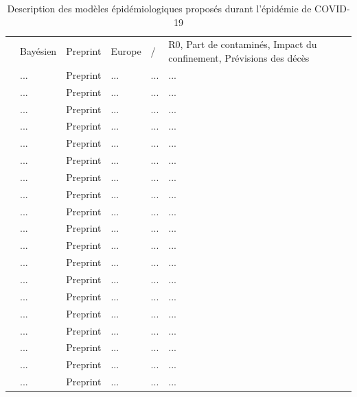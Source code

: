 \documentclass[review]{elsarticle}
\begin{document}
\begin{table}
\begin{adjustbox}{center}
{\begin{tabular}{p{4cm}|p{2cm}|p{2cm}|p{2cm}|p{2cm}|p{11cm}}
  \citet{flaxman_report_2020} & Bayésien & Preprint & Europe & / & R0, Part de contaminés, Impact du confinement, Prévisions des décès \\
  \citet{ferguson_report_2020} & ... & Preprint & ... &... &...  \\
  \citet{di_domenico_expected_2020} & ... & Preprint & ... &... &...  \\
  \citet{wilder_role_2020} & ... & Preprint & ... &... &...  \\
  \citet{simha_simple_2020} & ... & Preprint & ... &... &...  \\
  \citet{roux_covid-19_2020} & ... & Preprint & ... &... &...  \\
  \citet{pullano_population_2020} & ... & Preprint & ... &... &...  \\
  \citet{salje_estimating_2020} & ... & Preprint & ... &... &...  \\
  \citet{team_forecasting_2020} & ... & Preprint & ... &... &...  \\
  \citet{luo_predictive_2020} & ... & Preprint & ... &... &...  \\
  \citet{branas_flattening_2020} & ... & Preprint & ... &... &...  \\
  \citet{keskinocak_impact_2020} & ... & Preprint & ... &... &...  \\
  \citet{wang_spatiotemporal_2020} & ... & Preprint & ... &... &...  \\
  \citet{li_overview_2020} & ... & Preprint & ... &... &...  \\
  \citet{woody_projections_2020} & ... & Preprint & ... &... &...  \\
  \citet{pei_initial_2020} & ... & Preprint & ... &... &...  \\
  \citet{platen_stochastic_2020} & ... & Preprint & ... &... &...  \\
  \citet{arenas_mathematical_2020} & ... & Preprint & ... &... &...  \\
  \citet{sanche_high_2020} & ... & Preprint & ... &... &...  \\
  \citet{aleta_modeling_2020} & ... & Preprint & ... &... &...  \\

\end{tabular}}
\end{adjustbox}
\caption{Description des modèles épidémiologiques proposés durant l'épidémie de COVID-19}
\label{table:1}
\end{table}
\end{document}
